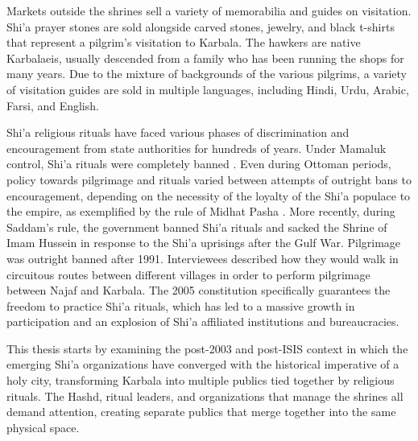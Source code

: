 Markets outside the shrines sell a variety of memorabilia and guides on visitation. Shi'a prayer stones are sold alongside carved stones, jewelry, and black t-shirts that represent a pilgrim's visitation to Karbala. The hawkers are native Karbalaeis, usually descended from a family who has been running the shops for many years. Due to the mixture of backgrounds of the various pilgrims, a variety of visitation guides are sold in multiple languages, including Hindi, Urdu, Arabic, Farsi, and English. 

Shi'a religious rituals have faced various phases of discrimination and encouragement from state authorities for hundreds of years. Under Mamaluk control, Shi'a rituals were completely banned \cite{yitzhak_nakash_attempt_1993}. Even during Ottoman periods, policy towards pilgrimage and rituals varied between attempts of outright bans to encouragement, depending on the necessity of the loyalty of the Shi'a populace to the empire, as exemplified by the rule of Midhat Pasha \cite{aghaie_martyrs_2004}. More recently, during Saddam's rule, the government banned Shi'a rituals and sacked the Shrine of Imam Hussein in response to the Shi'a uprisings after the Gulf War. Pilgrimage was outright banned after 1991. Interviewees described how they would walk in circuitous routes between different villages in order to perform pilgrimage between Najaf and Karbala. The 2005 constitution specifically guarantees the freedom to practice Shi'a rituals, which has led to a massive growth in participation and an explosion of Shi'a affiliated institutions and bureaucracies. 

This thesis starts by examining the post-2003 and post-ISIS context in which the emerging Shi'a organizations have converged with the historical imperative of a holy city, transforming Karbala into multiple publics tied together by religious rituals. The Hashd, ritual leaders, and organizations that manage the shrines all demand attention, creating separate publics that merge together into the same physical space. 